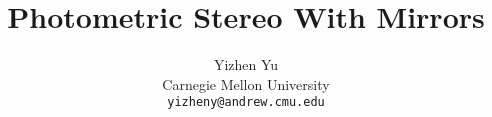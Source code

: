 \documentclass[10pt, twocolumn, letterpaper]{article}
\begin{document}
  \title{Photometric Stereo With Mirrors}
  \author{
    Yizhen Yu \\
    Carnegie Mellon University \\
    \texttt{\small yizheny@andrew.cmu.edu}
  }
  \maketitle
  
  
  
  
  
  
  
  {
    \small
    
    
  }
  \newpage
  
\end{document}
